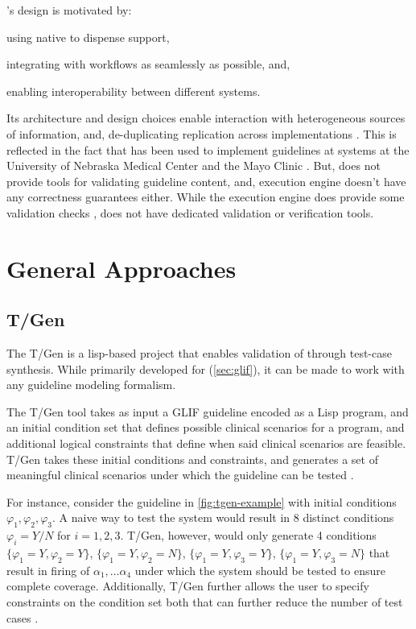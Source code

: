 \SAGE{}'s design is motivated by:
\begin{enumerate*}[label=(\roman*)]
  \item using native \EHR{} to dispense support,
  \item integrating with workflows as seamlessly as possible, and,
  \item enabling interoperability between different \EHR{} systems.
\end{enumerate*}
Its architecture and design choices enable interaction with heterogeneous
sources of information, and, de-duplicating replication across \EHR{}
implementations \cite{TuAMIA07}. This is reflected in the fact that
\SAGE{} has been used to implement guidelines at \EHR{} systems
at the University of Nebraska Medical Center and the Mayo Clinic \cite{TuAMIA07}.
But, \SAGE{} does not provide tools for validating guideline content, and,
execution engine doesn't have any correctness guarantees either. While
the execution engine does provide some validation checks \cite{RamMEDINFO04},
\SAGE{} does not have dedicated validation or verification tools.

\section{General Approaches}\label{sec:general-approaches}

\subsection{T/Gen}

The T/Gen is a lisp-based project that enables validation
of \CIGs{} through test-case synthesis. While
primarily developed for \GLIF{} (\autoref{sec:glif}),
it can be made to work with any guideline modeling formalism.

The T/Gen tool takes as input a GLIF guideline encoded as a
Lisp program, and an initial condition set that defines
possible clinical scenarios for a program, and additional
logical constraints that define when said clinical scenarios are
feasible. T/Gen takes these initial conditions and constraints, and
generates a set of meaningful clinical scenarios under which the
guideline can be tested \cite{MillerJAMIA01}.

For instance, consider the guideline in \autoref{fig:tgen-example}
with initial conditions $\varphi_1, \varphi_2, \varphi_3$. A naive
way to test the system would result in 8 distinct conditions $\varphi_i = Y/N$
for $i = 1,2,3$. T/Gen, however, would only generate
4 conditions $\{\varphi_1 = Y, \varphi_2 = Y\}$,
$\{\varphi_1 = Y, \varphi_2 = N\}$, $\{\varphi_1 = Y, \varphi_3 = Y\}$,
$\{\varphi_1 = Y, \varphi_3 = N\}$ that result in firing of $\alpha_1, \dots
\alpha_4$ under which the system should be tested to ensure complete coverage.
Additionally, T/Gen further allows the user to specify constraints on
the condition set both that can further reduce
the number of test cases \cite{MillerJAMIA01}.

